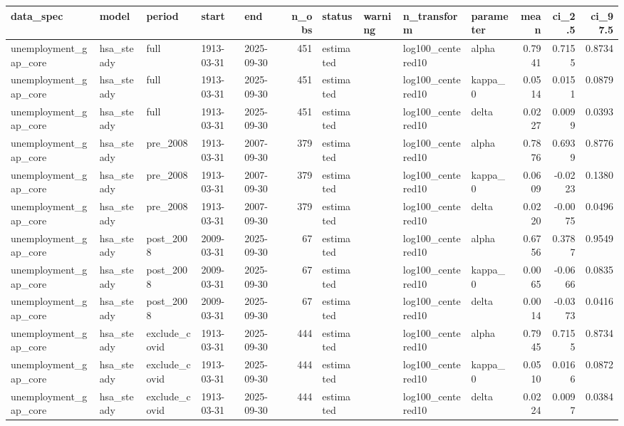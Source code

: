 \begin{tabular}{lllllrllllrrr}
\toprule
data\_spec & model & period & start & end & n\_obs & status & warning & n\_transform & parameter & mean & ci\_2.5 & ci\_97.5 \\
\midrule
unemployment\_gap\_core & hsa\_steady & full & 1913-03-31 & 2025-09-30 & 451 & estimated &  & log100\_centered10 & alpha & 0.7941 & 0.7155 & 0.8734 \\
unemployment\_gap\_core & hsa\_steady & full & 1913-03-31 & 2025-09-30 & 451 & estimated &  & log100\_centered10 & kappa\_0 & 0.0514 & 0.0151 & 0.0879 \\
unemployment\_gap\_core & hsa\_steady & full & 1913-03-31 & 2025-09-30 & 451 & estimated &  & log100\_centered10 & delta & 0.0227 & 0.0099 & 0.0393 \\
unemployment\_gap\_core & hsa\_steady & pre\_2008 & 1913-03-31 & 2007-09-30 & 379 & estimated &  & log100\_centered10 & alpha & 0.7876 & 0.6939 & 0.8776 \\
unemployment\_gap\_core & hsa\_steady & pre\_2008 & 1913-03-31 & 2007-09-30 & 379 & estimated &  & log100\_centered10 & kappa\_0 & 0.0609 & -0.0223 & 0.1380 \\
unemployment\_gap\_core & hsa\_steady & pre\_2008 & 1913-03-31 & 2007-09-30 & 379 & estimated &  & log100\_centered10 & delta & 0.0220 & -0.0075 & 0.0496 \\
unemployment\_gap\_core & hsa\_steady & post\_2008 & 2009-03-31 & 2025-09-30 & 67 & estimated &  & log100\_centered10 & alpha & 0.6756 & 0.3787 & 0.9549 \\
unemployment\_gap\_core & hsa\_steady & post\_2008 & 2009-03-31 & 2025-09-30 & 67 & estimated &  & log100\_centered10 & kappa\_0 & 0.0065 & -0.0666 & 0.0835 \\
unemployment\_gap\_core & hsa\_steady & post\_2008 & 2009-03-31 & 2025-09-30 & 67 & estimated &  & log100\_centered10 & delta & 0.0014 & -0.0373 & 0.0416 \\
unemployment\_gap\_core & hsa\_steady & exclude\_covid & 1913-03-31 & 2025-09-30 & 444 & estimated &  & log100\_centered10 & alpha & 0.7945 & 0.7155 & 0.8734 \\
unemployment\_gap\_core & hsa\_steady & exclude\_covid & 1913-03-31 & 2025-09-30 & 444 & estimated &  & log100\_centered10 & kappa\_0 & 0.0510 & 0.0166 & 0.0872 \\
unemployment\_gap\_core & hsa\_steady & exclude\_covid & 1913-03-31 & 2025-09-30 & 444 & estimated &  & log100\_centered10 & delta & 0.0224 & 0.0097 & 0.0384 \\

\end{tabular}
